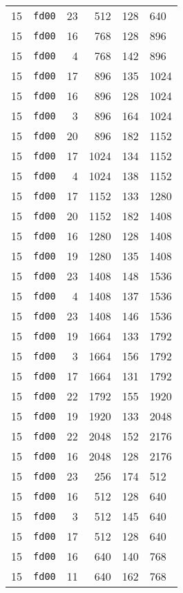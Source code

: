 \documentclass{article}
\begin{document}
\begin{table}[h!]
\begin{tabular}{llrrrl}
    15 & \texttt{fd00} & 23 & 512 & 128 & 640 \\
    15 & \texttt{fd00} & 16 & 768 & 128 & 896 \\
    15 & \texttt{fd00} & 4 & 768 & 142 & 896 \\
    15 & \texttt{fd00} & 17 & 896 & 135 & 1024 \\
    15 & \texttt{fd00} & 16 & 896 & 128 & 1024 \\
    15 & \texttt{fd00} & 3 & 896 & 164 & 1024 \\
    15 & \texttt{fd00} & 20 & 896 & 182 & 1152 \\
    15 & \texttt{fd00} & 17 & 1024 & 134 & 1152 \\
    15 & \texttt{fd00} & 4 & 1024 & 138 & 1152 \\
    15 & \texttt{fd00} & 17 & 1152 & 133 & 1280 \\
    15 & \texttt{fd00} & 20 & 1152 & 182 & 1408 \\
    15 & \texttt{fd00} & 16 & 1280 & 128 & 1408 \\
    15 & \texttt{fd00} & 19 & 1280 & 135 & 1408 \\
    15 & \texttt{fd00} & 23 & 1408 & 148 & 1536 \\
    15 & \texttt{fd00} & 4 & 1408 & 137 & 1536 \\
    15 & \texttt{fd00} & 23 & 1408 & 146 & 1536 \\
    15 & \texttt{fd00} & 19 & 1664 & 133 & 1792 \\
    15 & \texttt{fd00} & 3 & 1664 & 156 & 1792 \\
    15 & \texttt{fd00} & 17 & 1664 & 131 & 1792 \\
    15 & \texttt{fd00} & 22 & 1792 & 155 & 1920 \\
    15 & \texttt{fd00} & 19 & 1920 & 133 & 2048 \\
    15 & \texttt{fd00} & 22 & 2048 & 152 & 2176 \\
    15 & \texttt{fd00} & 16 & 2048 & 128 & 2176 \\
    15 & \texttt{fd00} & 23 & 256 & 174 & 512 \\
    15 & \texttt{fd00} & 16 & 512 & 128 & 640 \\
    15 & \texttt{fd00} & 3 & 512 & 145 & 640 \\
    15 & \texttt{fd00} & 17 & 512 & 128 & 640 \\
    15 & \texttt{fd00} & 16 & 640 & 140 & 768 \\
    15 & \texttt{fd00} & 11 & 640 & 162 & 768 \\

\end{tabular}
\end{table}
\end{document}
